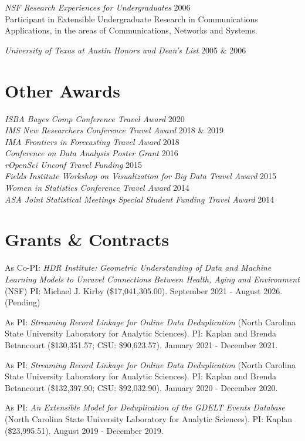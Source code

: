 \documentclass[margin,line]{res}
\begin{document}
\begin{resume}
{\em NSF Research Experiences for Undergraduates } \hfill 2006\\
Participant in Extensible Undergraduate Research in Communications Applications, in the areas of Communications, Networks and Systems.

{\em University of Texas at Austin Honors and Dean's List } \hfill 2005 \& 2006

\section{\sc Other Awards}
{\em ISBA Bayes Comp Conference Travel Award} \hfill 2020 \\
{\em IMS New Researchers Conference Travel Award} \hfill 2018 \& 2019 \\
{\em IMA Frontiers in Forecasting Travel Award} \hfill 2018\\
{\em Conference on Data Analysis Poster Grant } \hfill 2016\\
{\em rOpenSci Unconf Travel Funding } \hfill 2015\\
{\em Fields Institute Workshop on Visualization for Big Data Travel Award } \hfill 2015\\
{\em Women in Statistics Conference Travel Award } \hfill 2014\\
{\em ASA Joint Statistical Meetings Special Student Funding Travel Award } \hfill 2014

\section{\sc Grants \& Contracts}
As Co-PI: {\em HDR Institute: Geometric Understanding of Data and Machine Learning Models to Unravel Connections Between Health, Aging and Environment} (NSF) PI: Michael J. Kirby (\$17,041,305.00). September 2021 - August 2026. (Pending)

As PI: {\em Streaming Record Linkage for Online Data Deduplication} (North Carolina State University Laboratory for Analytic Sciences). PI: Kaplan and Brenda Betancourt (\$130,351.57; CSU: \$90,623.57). January 2021 - December 2021.

As PI: {\em Streaming Record Linkage for Online Data Deduplication} (North Carolina State University Laboratory for Analytic Sciences). PI: Kaplan and Brenda Betancourt (\$132,397.90; CSU: \$92,032.90). January 2020 - December 2020.

As PI: {\em An Extensible Model for Deduplication of the GDELT Events Database} (North Carolina State University Laboratory for Analytic Sciences). PI: Kaplan (\$23,995.51). August 2019 - December 2019.


\end{resume}
\end{document}
